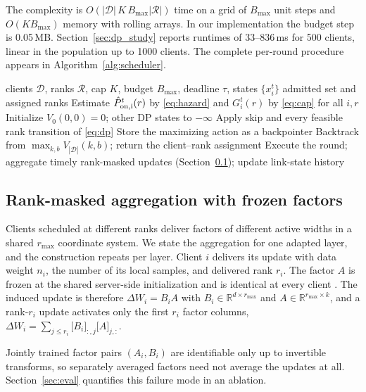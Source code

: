 \documentclass[preprint,12pt]{elsarticle}
\begin{document}
The complexity is $O(|\mathcal D|\,K\,B_{\max}|\mathcal R|)$ time on a grid of $B_{\max}$ unit steps and $O(KB_{\max})$ memory with rolling arrays. In our implementation the budget step is 0.05\,MB. Section~\ref{sec:dp_study} reports runtimes of 33--836\,ms for 500 clients, linear in the population up to 1000 clients. The complete per-round procedure appears in Algorithm~\ref{alg:scheduler}.

\begin{algorithm}[t]
\caption{FedRAS scheduling round}
\label{alg:scheduler}
\begin{algorithmic}[1]
\REQUIRE clients $\mathcal D$, ranks $\mathcal R$, cap $K$, budget $B_{\max}$, deadline $\tau$, states $\{x_i^t\}$
\ENSURE admitted set and assigned ranks
\STATE Estimate $\hat P_{\rm on,i}^t(r)$ by \eqref{eq:hazard} and $G_i^t(r)$ by \eqref{eq:cap} for all $i,r$
\STATE Initialize $V_0(0,0)=0$; other DP states to $-\infty$
    \STATE Apply skip and every feasible rank transition of \eqref{eq:dp}
    \STATE Store the maximizing action as a backpointer
  \ENDFOR
\ENDFOR
\STATE Backtrack from $\max_{k,b} V_{|\mathcal D|}(k,b)$; return the client--rank assignment
\STATE Execute the round; aggregate timely rank-masked updates (Section~\ref{sec:aggregation}); update link-state history
\end{algorithmic}
\end{algorithm}

\subsection{Rank-masked aggregation with frozen factors}
\label{sec:aggregation}
Clients scheduled at different ranks deliver factors of different active widths in a shared $r_{\max}$ coordinate system. We state the aggregation for one adapted layer, and the construction repeats per layer. Client $i$ delivers its update with data weight $n_i$, the number of its local samples, and delivered rank $r_i$. The factor $A$ is frozen at the shared server-side initialization and is identical at every client \cite{sun2024ffalora}. The induced update is therefore $\Delta W_i=B_iA$ with $B_i\in\mathbb R^{d\times r_{\max}}$ and $A\in\mathbb R^{r_{\max}\times k}$, and a rank-$r_i$ update activates only the first $r_i$ factor columns, $\Delta W_i=\sum_{j\le r_i}\big[B_i\big]_{:,j}\big[A\big]_{j,:}$.

Jointly trained factor pairs $(A_i,B_i)$ are identifiable only up to invertible transforms, so separately averaged factors need not average the updates at all. Section~\ref{sec:eval} quantifies this failure mode in an ablation.
\end{document}
